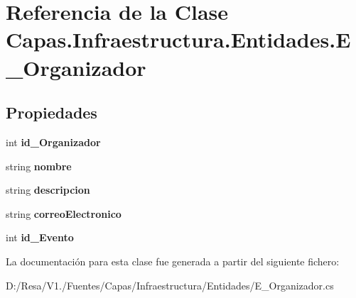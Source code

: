 \section{Referencia de la Clase Capas.\+Infraestructura.\+Entidades.\+E\+\_\+\+Organizador}
\label{class_capas_1_1_infraestructura_1_1_entidades_1_1_e___organizador}
\subsection*{Propiedades}
\begin{DoxyCompactItemize}
\item 
int {\bfseries id\+\_\+\+Organizador}\hspace{0.3cm}{\ttfamily  [get, set]}\label{class_capas_1_1_infraestructura_1_1_entidades_1_1_e___organizador_a7e4ca14dfb0910f09f5440c984211b14}

\item 
string {\bfseries nombre}\hspace{0.3cm}{\ttfamily  [get, set]}\label{class_capas_1_1_infraestructura_1_1_entidades_1_1_e___organizador_aae2c8e0ee101562c8b9c6289581f3269}

\item 
string {\bfseries descripcion}\hspace{0.3cm}{\ttfamily  [get, set]}\label{class_capas_1_1_infraestructura_1_1_entidades_1_1_e___organizador_a014dda4b1773d39b1bba53954dca775d}

\item 
string {\bfseries correo\+Electronico}\hspace{0.3cm}{\ttfamily  [get, set]}\label{class_capas_1_1_infraestructura_1_1_entidades_1_1_e___organizador_a68c7ac5cbadb24795192352157a161f7}

\item 
int {\bfseries id\+\_\+\+Evento}\hspace{0.3cm}{\ttfamily  [get, set]}\label{class_capas_1_1_infraestructura_1_1_entidades_1_1_e___organizador_aa40838909c0c550a318fce119efa5536}

\end{DoxyCompactItemize}


La documentación para esta clase fue generada a partir del siguiente fichero\+:\begin{DoxyCompactItemize}
\item 
D\+:/\+Resa/\+V1./\+Fuentes/\+Capas/\+Infraestructura/\+Entidades/E\+\_\+\+Organizador.\+cs\end{DoxyCompactItemize}
